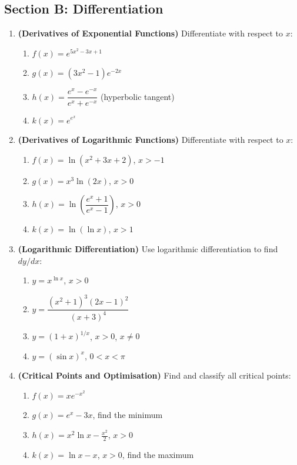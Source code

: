 \documentclass[12pt, a4paper]{article}
\theoremstyle{definition}
\begin{document}
\subsection{Section B: Differentiation}

\begin{enumerate}[label=\textbf{B\arabic*.}, leftmargin=2.5em]

\item \textbf{(Derivatives of Exponential Functions)} Differentiate with respect to $x$:
\begin{enumerate}[label=(\alph*)]
  \item $f(x) = e^{5x^2-3x+1}$
  \item $g(x) = (3x^2-1)e^{-2x}$
  \item $h(x) = \dfrac{e^x - e^{-x}}{e^x + e^{-x}}$ \quad (hyperbolic tangent)
  \item $k(x) = e^{e^x}$
\end{enumerate}

\item \textbf{(Derivatives of Logarithmic Functions)} Differentiate with respect to $x$:
\begin{enumerate}[label=(\alph*)]
  \item $f(x) = \ln(x^2 + 3x + 2)$, \; $x > -1$
  \item $g(x) = x^3\ln(2x)$, \; $x > 0$
  \item $h(x) = \ln\!\left(\dfrac{e^x + 1}{e^x - 1}\right)$, \; $x > 0$
  \item $k(x) = \ln(\ln x)$, \; $x > 1$
\end{enumerate}

\item \textbf{(Logarithmic Differentiation)} Use logarithmic differentiation to find $dy/dx$:
\begin{enumerate}[label=(\alph*)]
  \item $y = x^{\ln x}$, \; $x > 0$
  \item $y = \dfrac{(x^2+1)^3(2x-1)^2}{(x+3)^4}$
  \item $y = (1+x)^{1/x}$, \; $x > 0$, $x \neq 0$
  \item $y = (\sin x)^x$, \; $0 < x < \pi$
\end{enumerate}

\item \textbf{(Critical Points and Optimisation)} Find and classify all critical points:
\begin{enumerate}[label=(\alph*)]
  \item $f(x) = xe^{-x^2}$
  \item $g(x) = e^x - 3x$, find the minimum
  \item $h(x) = x^2\ln x - \frac{x^2}{2}$, \; $x > 0$
  \item $k(x) = \ln x - x$, \; $x > 0$, find the maximum
\end{enumerate}

\end{enumerate}
\end{document}

